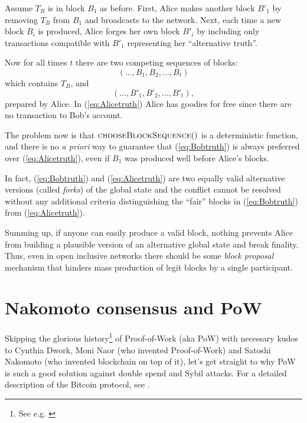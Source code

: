 \documentclass[a4paper]{article}
\begin{document}
  Assume $T_B$ is in block $B_1$ as before. 
   First, Alice makes another block $B'_1$ by removing $T_B$ from $B_1$ and broadcasts to the network. Next, each time a new block $B_i$ is produced, Alice forges her own block $B'_i$ by including only transactions compatible with $B'_1$ representing her ``alternative truth''.
   
   Now for all times $t$ there are two competing sequences of blocks:
 \begin{equation} \label{eq:Bobtruth} \tag{CANONICAL}
 (\ldots, B_1, B_2, \ldots, B_t)
\end{equation}
 which contains $T_B$, and
 \begin{equation} \label{eq:Alicetruth} \tag{ALICE}
 (\ldots, B'_1, B'_2, \ldots, B'_t),
\end{equation}
 prepared by Alice. In (\ref{eq:Alicetruth}) Alice has goodies for free since there are no transaction to Bob's account. 
 
 
 The problem now is that $\Call{chooseBlockSequence}$ is a deterministic function, and there is no \emph{a priori} way to guarantee that (\ref{eq:Bobtruth}) is always preferred over (\ref{eq:Alicetruth}), even if $B_1$ was produced well before Alice's blocks.
 
In fact, (\ref{eq:Bobtruth}) and (\ref{eq:Alicetruth}) are two equally valid alternative versions (called \emph{forks}) of the global state and the conflict cannot be resolved without any additional criteria distinguishing the ``fair'' blocks in (\ref{eq:Bobtruth}) from (\ref{eq:Alicetruth}). 
 
 Summing up, if anyone can easily produce a valid block, nothing prevents Alice from building a plausible version of an alternative global state and break finality. Thus, even in open inclusive networks there should be some \emph{block proposal} mechanism that hinders mass production of legit blocks by a single participant. 
    
\section{Nakomoto consensus and PoW} \label{sec:Nakomoto_and_PoW}

Skipping the glorious history\footnote{See e.g. \cite{ConsensusBlockchain}} of Proof-of-Work (aka PoW) with necessary kudos to Cynthia Dwork, Moni Naor (who invented Proof-of-Work) and Satoshi Nakomoto (who invented blockchain on top of it), let's get straight to why PoW is such a good solution against double spend and Sybil attacks. For a detailed description of the Bitcoin protocol, see \cite{bitcoin_wp}. 
\end{document}
